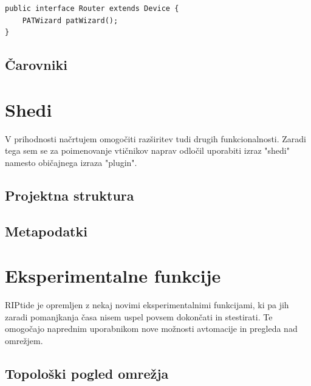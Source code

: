 \documentclass[12pt]{article}
\begin{document}
\begin{lstlisting}
public interface Router extends Device {
	PATWizard patWizard();
}
\end{lstlisting}


\subsection{Čarovniki}
\newpage

\section{Shedi}
V prihodnosti načrtujem omogočiti razširitev tudi drugih funkcionalnosti.
Zaradi tega sem se za poimenovanje vtičnikov naprav odločil uporabiti
izraz "shedi" namesto običajnega izraza "plugin".

\subsection{Projektna struktura} \label{projektna-struktura}
\subsection{Metapodatki}
\subsection{}
\newpage

\section{Eksperimentalne funkcije}
RIPtide je opremljen z nekaj novimi eksperimentalnimi funkcijami,
ki pa jih zaradi pomanjkanja časa nisem uspel povsem dokončati in
stestirati. Te omogočajo naprednim uporabnikom nove možnosti avtomacije
in pregleda nad omrežjem.

\subsection{Topološki pogled omrežja}
\newpage
\end{document}
